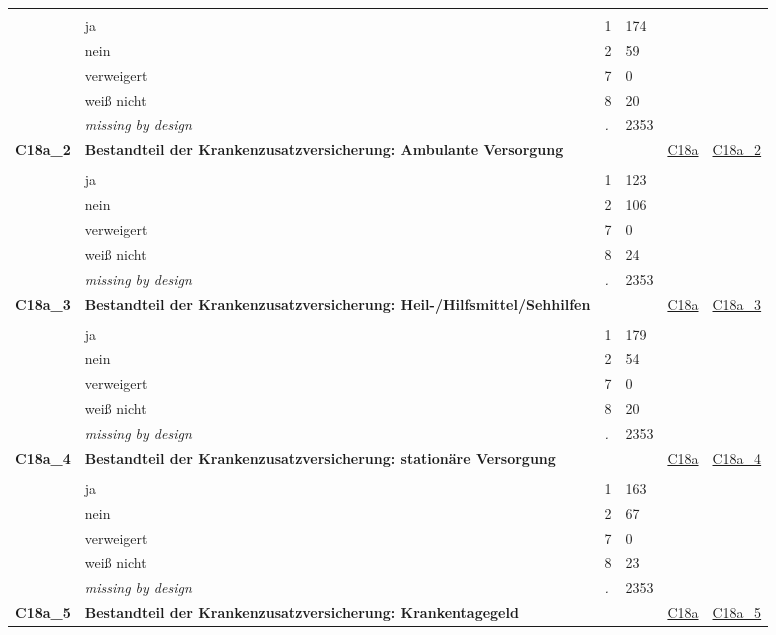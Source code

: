 \begin{longtable}{| L{2.45cm} | L{6cm} | C{1.5cm} | R{1cm} | C{2.25cm} | C{2.25cm} |}
   &  &  &  &  &  \\ 
   & ja & 1 & 174 &  &  \\ 
   & nein & 2 & 59 &  &  \\ 
   & verweigert & 7 & 0 &  &  \\ 
   & weiß nicht & 8 & 20 &  &  \\ 
   & \textit{missing by design} & \textit{.} & 2353 &  &  \\ 
   \midrule
\textbf{C18a\_2}\label{var:C18a:2} & \textbf{Bestandteil der Krankenzusatzversicherung: Ambulante Versorgung} &  &  & \hyperref[C18a]{C18a} & \hyperref[var:suf:C18a:2]{C18a\_2} \\ 
   &  &  &  &  &  \\ 
   & ja & 1 & 123 &  &  \\ 
   & nein & 2 & 106 &  &  \\ 
   & verweigert & 7 & 0 &  &  \\ 
   & weiß nicht & 8 & 24 &  &  \\ 
   & \textit{missing by design} & \textit{.} & 2353 &  &  \\ 
   \midrule
\textbf{C18a\_3}\label{var:C18a:3} & \textbf{Bestandteil der Krankenzusatzversicherung: Heil-/Hilfsmittel/Sehhilfen} &  &  & \hyperref[C18a]{C18a} & \hyperref[var:suf:C18a:3]{C18a\_3} \\ 
   &  &  &  &  &  \\ 
   & ja & 1 & 179 &  &  \\ 
   & nein & 2 & 54 &  &  \\ 
   & verweigert & 7 & 0 &  &  \\ 
   & weiß nicht & 8 & 20 &  &  \\ 
   & \textit{missing by design} & \textit{.} & 2353 &  &  \\ 
   \midrule
\textbf{C18a\_4}\label{var:C18a:4} & \textbf{Bestandteil der Krankenzusatzversicherung: stationäre Versorgung} &  &  & \hyperref[C18a]{C18a} & \hyperref[var:suf:C18a:4]{C18a\_4} \\ 
   &  &  &  &  &  \\ 
   & ja & 1 & 163 &  &  \\ 
   & nein & 2 & 67 &  &  \\ 
   & verweigert & 7 & 0 &  &  \\ 
   & weiß nicht & 8 & 23 &  &  \\ 
   & \textit{missing by design} & \textit{.} & 2353 &  &  \\ 
   \midrule
\textbf{C18a\_5}\label{var:C18a:5} & \textbf{Bestandteil der Krankenzusatzversicherung: Krankentagegeld} &  &  & \hyperref[C18a]{C18a} & \hyperref[var:suf:C18a:5]{C18a\_5} \\ 

\end{longtable}
